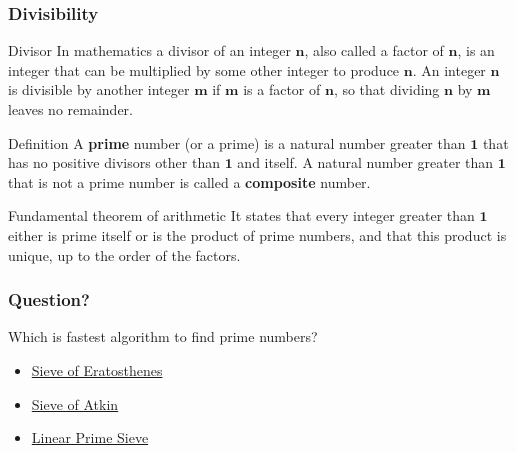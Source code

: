 \documentclass{beamer}
\begin{document}
\begin{frame}
\frametitle{Divisibility}
 \begin{block}{Divisor}
In mathematics a divisor of an integer $\mathbf{n}$, also called a factor of $\mathbf{n}$, is an integer that can be multiplied by some other integer to produce $\mathbf{n}$. An integer $\mathbf{n}$ is divisible by another integer $\mathbf{m}$ if $\mathbf{m}$ is a factor of $\mathbf{n}$, so that dividing $\mathbf{n}$ by $\mathbf{m}$ leaves no remainder. 
\end{block}
 \begin{block}{Definition}
A \textbf{prime} number (or a prime) is a natural number greater than $\mathbf{1}$ that has no positive divisors other than $\mathbf{1}$ and itself. A natural number greater than $\mathbf{1}$ that is not a prime number is called a \textbf{composite} number. 
\end{block}
 \begin{block}{Fundamental theorem of arithmetic}
It states that every integer greater than $\mathbf{1}$ either is prime itself or is the product of prime numbers, and that this product is unique, up to the order of the factors.
\end{block}
\end{frame}

\begin{frame}
\frametitle{Question?}
 Which is fastest algorithm to find prime numbers?
\begin{itemize}
 \item \href{https://en.wikipedia.org/wiki/Sieve_of_Eratosthenes}{Sieve of Eratosthenes}
 \item \href{https://en.wikipedia.org/wiki/Sieve_of_Atkin}{Sieve of Atkin}
 \item \href{http://e-maxx.ru/algo/prime_sieve_linear}{Linear Prime Sieve}
\end{itemize}
\end{frame}
\end{document}
